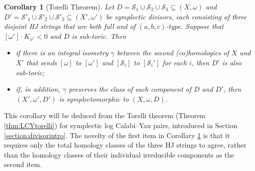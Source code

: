 \documentclass[11pt]{article}
\newtheorem{theorem}{Theorem}[section]
\newtheorem{corollary}[theorem]{Corollary}
\theoremstyle{definition}
\theoremstyle{remark}
\newcommand{\st}{\mathcal{S}}
\newcommand{\e}{\mathfrak{e}}
\newcommand{\sto}{\mathfrak{o}}
\begin{document}
\begin{corollary}[Torelli Theorem]\label{cor:torelli}
  Let $D=\st_1\cup\st_2\cup\st_3\subseteq (X,\omega)$ and $D'=\st'_1\cup\st'_2\cup\st'_3\subseteq (X',\omega')$ be symplectic divisors, each consisting of three disjoint HJ strings that are both full and of $(a,b,c)$-type. Suppose that $[\omega']\cdot K_{\omega'}<0$ and $D$ is sub-toric. Then
  \begin{itemize}[nosep]
    \item if there is an integral isometry $\gamma$ between the second (co)homologies of $X$ and $X'$ that sends $[\omega]$ to $[\omega']$ and $[\st_i]$ to $[\st_i']$ for each $i$, then $D'$ is also sub-toric;
    \item if, in addition, $\gamma$ preserves the class of each component of $D$ and $D'$, then $(X',\omega',D')$ is symplectomorphic to $(X,\omega,D)$.
  \end{itemize}
\end{corollary}

This corollary will be deduced from the Torelli theorem (Theorem \ref{thm:LCYtorelli}) for symplectic log Calabi--Yau pairs, introduced in Section \ref{section:divisorintro}. The novelty of the first item in Corollary \ref{cor:torelli} is that it requires only the total homology classes of the three HJ strings to agree, rather than the homology classes of their individual irreducible components as the second item.


\end{document}
